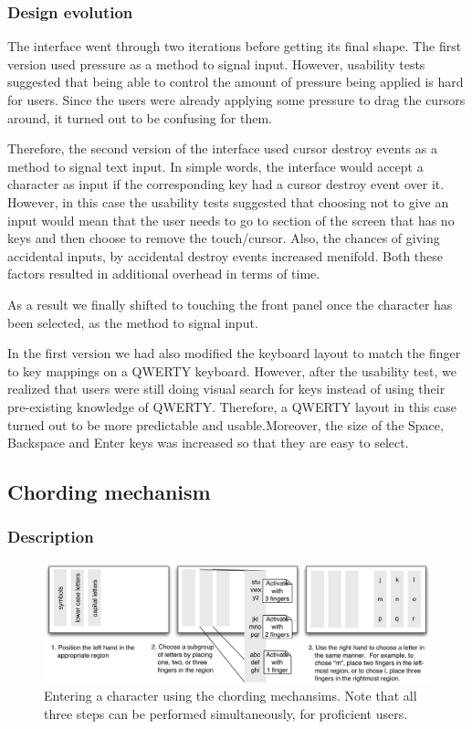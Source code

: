\subsubsection{Design evolution}

The interface went through two iterations before getting its final
shape. The first version used pressure as a method to signal
input. However, usability tests suggested that being able to control
the amount of pressure being applied is hard for users. Since the
users were already applying some pressure to drag the cursors around,
it turned out to be confusing for them.

Therefore, the second version of the interface used cursor destroy
events as a method to signal text input. In simple words, the
interface would accept a character as input if the corresponding key
had a cursor destroy event over it. However, in this case the
usability tests suggested that choosing not to give an input would
mean that the user needs to go to section of the screen that has no
keys and then choose to remove the touch/cursor. Also, the chances of
giving accidental inputs, by accidental destroy events increased
menifold. Both these factors resulted in additional overhead in terms
of time.

As a result we finally shifted to touching the front panel once the
character has been selected, as the method to signal input.

In the first version we had also modified the keyboard layout to match
the finger to key mappings on a QWERTY keyboard. However,
after the usability test, we realized that users were still doing
visual search for keys instead of using their pre-existing knowledge
of QWERTY. Therefore, a QWERTY layout in this case turned out to be
more predictable and usable.Moreover, the size of the Space, Backspace
and Enter keys was increased so that they are easy to select.

\subsection{Chording mechanism}
\subsubsection{Description}

\begin{figure}
    \includegraphics[width=\textwidth]{Figures/chording_explaination.pdf} 
    \caption{Entering a character using the chording mechansims.  Note
      that all three steps can be performed simultaneously, for
      proficient users.}
\end{figure} 

